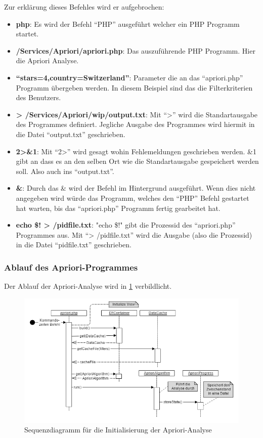 Zur erklärung dieses Befehles wird er aufgebrochen:
\begin{itemize}
	\item \textbf{php}: Es wird der Befehl "`PHP"' ausgeführt welcher ein PHP Programm startet.
	\item \textbf{/Services/Apriori/apriori.php}: Das auszuführende PHP Programm. Hier die Apriori Analyse.
	\item \textbf{``stars=4,country=Switzerland''}: Parameter die an das "`apriori.php"' Programm übergeben werden. In diesem Beispiel sind das die Filterkriterien des Benutzers.
	\item \textbf{> /Services/Apriori/wip/output.txt}: Mit "`>"' wird die Standartausgabe des Programmes definiert. Jegliche Ausgabe des Programmes wird hiermit in die Datei "`output.txt"' geschrieben.
	\item \textbf{2>\&1}: Mit "`2>"' wird gesagt wohin Fehlemeldungen geschrieben werden. \&1 gibt an dass es an den selben Ort wie die Standartausgabe gespeichert werden soll. Also auch ins "`output.txt"'.
	\item \textbf{\&}: Durch das \& wird der Befehl im Hintergrund ausgeführt. Wenn dies nicht angegeben wird würde das Programm, welches den "`PHP"' Befehl gestartet hat warten, bis das "`apriori.php"' Programm fertig gearbeitet hat.
	\item \textbf{echo \$! > /pidfile.txt}: "echo \$!" gibt die Prozessid des "`apriori.php"' Programmes aus. Mit "`> /pidfile.txt"' wird die Ausgabe (also die Prozessid) in die Datei "`pidfile.txt"' geschrieben.
\end{itemize}

\subsubsection{Ablauf des Apriori-Programmes}
Der Ablauf der Apriori-Analyse wird in \cref{fig:proofofconcept:architektur:hintergrundprozesser:1} verbildlicht.

\begin{figure}[H]
	\centering
	\includegraphics[width=1\textwidth]{images/diagram-sequence-apriori}
	\caption{Sequenzdiagramm für die Initialisierung der Apriori-Analyse}
	\label{fig:proofofconcept:architektur:hintergrundprozesser:1}
\end{figure}

